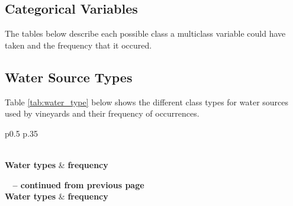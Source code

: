 \documentclass[review,12pt,authoryear]{elsarticle}
\begin{document}
\begin{linenumbers}
\section{Categorical Variables}
  The tables below describe each possible class a multiclass variable could have taken and the frequency that it occured.
  \subsection{Water Source Types}
  Table \ref{tab:water_type} below shows the different class types for water sources used by vineyards and their frequency of occurrences.

\begin{center}
  \begin{longtable}{p{0.5\linewidth} p{.35\linewidth}}
    \caption{Frequency and class types of water types used by vineyards.}\label{tab:water_type} \\
  
  \hline \textbf{Water types} & \textbf{frequency}\\ \hline 
  \endfirsthead
  
  {{\bfseries \tablename\ \thetable{} -- continued from previous page}} \\
  \hline \textbf{Water types} & \textbf{frequency} \\ \hline 
  \endhead
  
  \hline {} \\ \hline
  \endfoot
  

\end{longtable}
\end{center}
\end{linenumbers}
\end{document}
